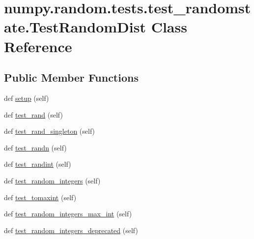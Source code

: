 \hypertarget{classnumpy_1_1random_1_1tests_1_1test__randomstate_1_1TestRandomDist}{}\section{numpy.\+random.\+tests.\+test\+\_\+randomstate.\+Test\+Random\+Dist Class Reference}
\label{classnumpy_1_1random_1_1tests_1_1test__randomstate_1_1TestRandomDist}
\subsection*{Public Member Functions}
\begin{DoxyCompactItemize}
\item 
def \hyperlink{classnumpy_1_1random_1_1tests_1_1test__randomstate_1_1TestRandomDist_a42ff91b0d45ba372427f6d1243d30f72}{setup} (self)
\item 
def \hyperlink{classnumpy_1_1random_1_1tests_1_1test__randomstate_1_1TestRandomDist_a2650f6c438ec8fb38a6845e52548c37d}{test\+\_\+rand} (self)
\item 
def \hyperlink{classnumpy_1_1random_1_1tests_1_1test__randomstate_1_1TestRandomDist_ac51da52c3b77b8bac5303ec5d59427a2}{test\+\_\+rand\+\_\+singleton} (self)
\item 
def \hyperlink{classnumpy_1_1random_1_1tests_1_1test__randomstate_1_1TestRandomDist_ace83997f2b90072b0ca5049f362bebd5}{test\+\_\+randn} (self)
\item 
def \hyperlink{classnumpy_1_1random_1_1tests_1_1test__randomstate_1_1TestRandomDist_a2ac2530051a1ab59ba0b3cd917a59027}{test\+\_\+randint} (self)
\item 
def \hyperlink{classnumpy_1_1random_1_1tests_1_1test__randomstate_1_1TestRandomDist_a51b97bb62ea7a2169ed0f9f25599cf4b}{test\+\_\+random\+\_\+integers} (self)
\item 
def \hyperlink{classnumpy_1_1random_1_1tests_1_1test__randomstate_1_1TestRandomDist_ae3e1628e4cfcba79c69ff9cfef3275ce}{test\+\_\+tomaxint} (self)
\item 
def \hyperlink{classnumpy_1_1random_1_1tests_1_1test__randomstate_1_1TestRandomDist_a828edf835cf6f88790b5b73d6f6f04b1}{test\+\_\+random\+\_\+integers\+\_\+max\+\_\+int} (self)
\item 
def \hyperlink{classnumpy_1_1random_1_1tests_1_1test__randomstate_1_1TestRandomDist_a581d501a03ff47a3e0f49dfc2f39ad28}{test\+\_\+random\+\_\+integers\+\_\+deprecated} (self)

\end{DoxyCompactItemize}
